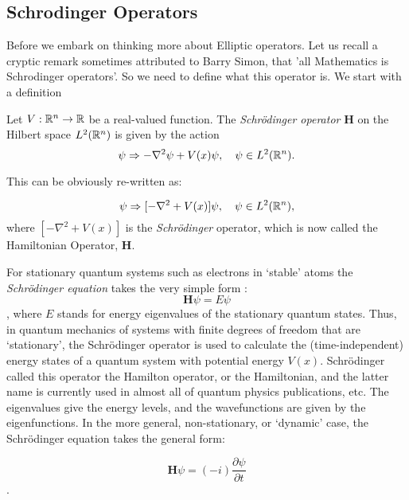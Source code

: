 \subsection{Schrodinger Operators}
Before we embark on thinking more about Elliptic operators. Let us recall a cryptic remark sometimes attributed to Barry
Simon, that 'all Mathematics is Schrodinger operators'. So we need to define what this operator is.
We start with a definition
\begin{dfn}
Let $V: \mathbb{R}^n \to \mathbb{R}$ be a real-valued function.
The \emph{Schr\"odinger operator} \textbf{H} on the Hilbert space $L^2(\mathbb{R}^n)$ is given by the action
\[
\psi \Rightarrow -\nabla^2\psi+V(x)\psi, \quad\psi\in L^2(\mathbb{R}^n).
\]

This can be obviously re-written as:

\[
\psi \Rightarrow [-\nabla^2 +V(x)]\psi, \quad\psi\in L^2(\mathbb{R}^n),
\] where $[-\nabla^2 +V(x)]$ is the {\em Schr\"odinger} operator, which is now
called the Hamiltonian Operator, \textbf{H}.
\end{dfn}
For stationary quantum systems such as electrons in `stable' atoms the {\em Schr\"odinger equation}
takes the very simple form :
\[
\textbf{H} \psi=E \psi
\] , where $E$ stands for energy eigenvalues of the stationary quantum states. Thus, in quantum mechanics of systems with finite degrees of freedom that are `stationary', the Schr\"odinger operator is used to calculate the (time-independent) energy states of a quantum system with potential energy $V(x)$. 
Schr\"odinger called this operator the Hamilton operator, or the
Hamiltonian, and the latter name is currently used in almost all of quantum physics publications, etc. 
The eigenvalues give the energy levels, and the wavefunctions are given by the eigenfunctions.
In the more general, non-stationary, or `dynamic' case, the Schr\"odinger equation takes the general form:

\[
\textbf{H} \psi= (-i) \frac{\partial \psi}{\partial t}
\]. 